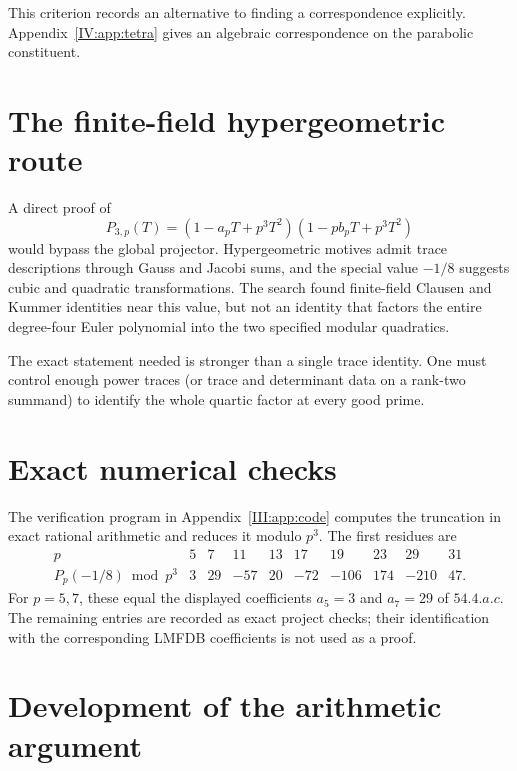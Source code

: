 \documentclass[11pt,letterpaper]{article}
\theoremstyle{definition}
\theoremstyle{remark}
\begin{document}
This criterion records an alternative to finding a correspondence
explicitly. Appendix~\ref{IV:app:tetra} gives an algebraic
correspondence on the parabolic constituent.

\section{The finite-field hypergeometric route}

A direct proof of
\[
 P_{3,p}(T)=
 (1-a_pT+p^3T^2)(1-pb_pT+p^3T^2)
\]
would bypass the global projector.  Hypergeometric motives admit trace descriptions through Gauss and
Jacobi sums, and the special value $-1/8$ suggests cubic and quadratic transformations.  The search
found finite-field Clausen and Kummer identities near this value, but not an identity that factors the
entire degree-four Euler polynomial into the two specified modular quadratics.

The exact statement needed is stronger than a single trace identity.  One must control enough power
traces (or trace and determinant data on a rank-two summand) to identify the whole quartic factor at every
good prime.

\section{Exact numerical checks}

The verification program in Appendix~\ref{III:app:code} computes the truncation in exact rational arithmetic
and reduces it modulo $p^3$.  The first residues are
\[
\begin{array}{c|rrrrrrrrr}
p&5&7&11&13&17&19&23&29&31\\ \hline
P_p(-1/8)\bmod p^3&3&29&-57&20&-72&-106&174&-210&47.
\end{array}
\]
For $p=5,7$, these equal the displayed coefficients $a_5=3$ and $a_7=29$ of $54.4.a.c$.
The remaining entries are recorded as exact project checks; their identification with the corresponding
LMFDB coefficients is not used as a proof.

\section{Development of the arithmetic argument}
\end{document}
